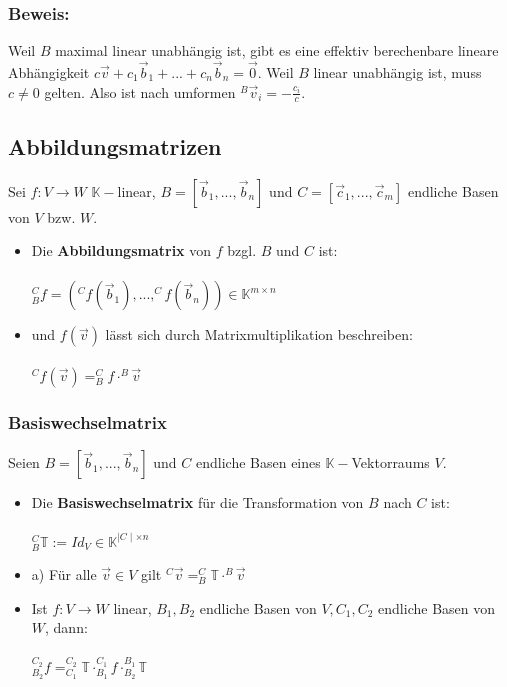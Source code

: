 \documentclass[titlepage]{article}
\newcommand{\K}{\mathbb{K}}
\newcommand{\1}{\mathbb{1}}
\newcommand{\0}{\mathbb{0}}
\newcommand{\T}{\mathbb{T}}
\begin{document}
				\subsubsection{Beweis:}
					Weil $B$ maximal linear unabhängig ist, gibt es eine effektiv berechenbare lineare Abhängigkeit $c\vec{v}+c_1\vec{b}_1+...+c_n\vec{b}_n=\vec{0}$. Weil $B$ linear unabhängig ist, muss $c\neq0$ gelten. Also ist nach umformen $^B\vec{v}_i=-\frac{c_i}{c}$.
			\subsection{Abbildungsmatrizen}
				Sei $f:V\rightarrow W$ $\K-$linear, $B=[\vec{b}_1,...,\vec{b}_n]$ und $C=[\vec{c}_1,...,\vec{c}_m]$ endliche Basen von $V$ bzw. $W$. 
				\begin{itemize}
					\item Die \textbf{Abbildungsmatrix} von $f$ bzgl. $B$ und $C$ ist:\\\\
					$^C_Bf=(^Cf(\vec{b}_1),...,^Cf(\vec{b}_n))\in\K^{m\times n}$
					\item und $f(\vec{v})$ lässt sich durch Matrixmultiplikation beschreiben:\\\\
					$^Cf(\vec{v})=^C_Bf\cdot^B\vec{v}$
				\end{itemize}
				\subsubsection{Basiswechselmatrix}
					Seien $B=[\vec{b}_1,...,\vec{b}_n]$ und $C$ endliche Basen eines $\K-$Vektorraums $V$.
					\begin{itemize}
						\item Die \textbf{Basiswechselmatrix} für die Transformation von $B$ nach $C$ ist:\\\\
						$^C_B\T:=Id_V\in\K^{\mid C\mid\times n}$
					\end{itemize}
					\begin{itemize}
						\item a) Für alle $\vec{v}\in V$ gilt $^C\vec{v}=^C_B\T\cdot^B\vec{v}$
						\item Ist $f:V\rightarrow W$ linear, $B_1,B_2$ endliche Basen von $V,C_1,C_2$ endliche Basen von $W$, dann:\\\\
						$^{C_2}_{B_2}f=^{C_2}_{C_1}\T\cdot^{C_1}_{B_1}f\cdot^{B_1}_{B_2}\T$
					\end{itemize}
\end{document}
